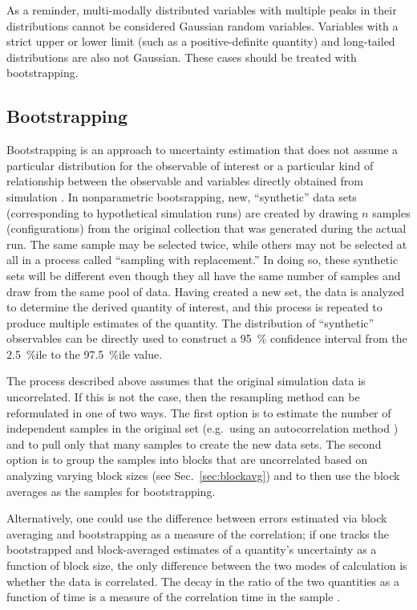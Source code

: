 As a reminder, multi-modally distributed variables with multiple peaks in their distributions cannot be considered Gaussian random variables.  Variables with a strict upper or lower limit (such as a positive-definite quantity) and long-tailed distributions are also not Gaussian.  These cases should be treated with bootstrapping.

\subsection{Bootstrapping}\label{sec:bootstrap}

Bootstrapping is an approach to uncertainty estimation that does not assume a particular distribution for the observable of interest or a particular kind of relationship between the observable and variables directly obtained from simulation \cite{Tibshirani1998}.  In nonparametric bootsrapping, new, ``synthetic'' data sets (corresponding to hypothetical simulation runs) are created by drawing $n$ samples (configurations) from the original collection that was generated during the actual run.  The same sample may be selected twice, while others may not be selected at all in a process called ``sampling with replacement.''  In doing so, these synthetic sets will be different even though they all have the same number of samples and draw from the same pool of data.  Having created a new set, the data is analyzed to determine the derived quantity of interest, and this process is repeated to produce multiple estimates of the quantity.  The distribution of ``synthetic'' observables can be directly used to construct a 95~\% confidence interval from the 2.5~\%ile to the 97.5~\%ile value.

The process described above assumes that the original simulation data is uncorrelated.  If this is not the case, then the resampling method can be reformulated in one of two ways.  The first option is to estimate the number of independent samples in the original set (e.g.\ using an autocorrelation method \cite{Chodera-2016,Lyman2007a}) and to pull only that many samples to create the new data sets.  The second option is to group the samples into blocks that are uncorrelated based on analyzing varying block sizes (see Sec.~\ref{sec:blockavg}) and to then use the block averages as the samples for bootstrapping.

Alternatively, one could use the difference between errors estimated via block averaging and bootstrapping as a measure of the correlation; if one tracks the bootstrapped and block-averaged estimates of a quantity's uncertainty as a function of block size, the only difference between the two modes of calculation is whether the data is correlated.  The decay in the ratio of the two quantities as a function of time is a measure of the correlation time in the sample \cite{Romo2011}.


